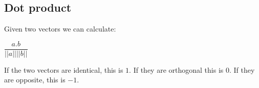 
\subsection{Dot product}

Given two vectors we can calculate:

\(\dfrac{a.b}{||a|| ||b||}\)

If the two vectors are identical, this is \(1\). If they are orthogonal this is \(0\). If they are opposite, this is \(-1\).

